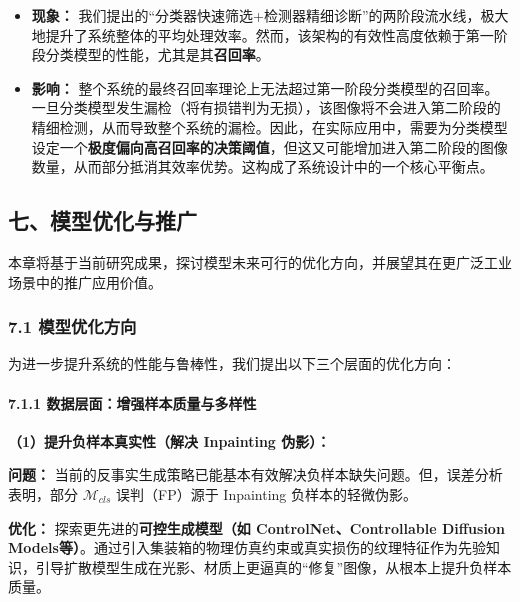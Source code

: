 \documentclass[
]{article}
\begin{document}
\begin{enumerate}
  \begin{itemize}
  \item
    \textbf{现象：}
    我们提出的``分类器快速筛选+检测器精细诊断''的两阶段流水线，极大地提升了系统整体的平均处理效率。然而，该架构的有效性高度依赖于第一阶段分类模型的性能，尤其是其\textbf{召回率}。
  \item
    \textbf{影响：}
    整个系统的最终召回率理论上无法超过第一阶段分类模型的召回率。一旦分类模型发生漏检（将有损错判为无损），该图像将不会进入第二阶段的精细检测，从而导致整个系统的漏检。因此，在实际应用中，需要为分类模型设定一个\textbf{极度偏向高召回率的决策阈值}，但这又可能增加进入第二阶段的图像数量，从而部分抵消其效率优势。这构成了系统设计中的一个核心平衡点。
  \end{itemize}
\end{enumerate}

\subsection{七、模型优化与推广}\label{ux4e03ux6a21ux578bux4f18ux5316ux4e0eux63a8ux5e7f}

本章将基于当前研究成果，探讨模型未来可行的优化方向，并展望其在更广泛工业场景中的推广应用价值。

\subsubsection{\texorpdfstring{\textbf{7.1
模型优化方向}}{7.1 模型优化方向}}\label{71-ux6a21ux578bux4f18ux5316ux65b9ux5411}

为进一步提升系统的性能与鲁棒性，我们提出以下三个层面的优化方向：

\paragraph{\texorpdfstring{\textbf{7.1.1
数据层面：增强样本质量与多样性}}{7.1.1 数据层面：增强样本质量与多样性}}\label{711-ux6570ux636eux5c42ux9762ux589eux5f3aux6837ux672cux8d28ux91cfux4e0eux591aux6837ux6027}

\textbf{（1）提升负样本真实性（解决 Inpainting 伪影）：}

\textbf{问题：}
当前的反事实生成策略已能基本有效解决负样本缺失问题。但，误差分析表明，部分
\(\mathcal{M}_{cls}\) 误判（FP）源于 Inpainting 负样本的轻微伪影。

\textbf{优化：} 探索更先进的\textbf{可控生成模型（如
ControlNet、Controllable Diffusion
Models等）}。通过引入集装箱的物理仿真约束或真实损伤的纹理特征作为先验知识，引导扩散模型生成在光影、材质上更逼真的``修复''图像，从根本上提升负样本质量。
\end{document}
